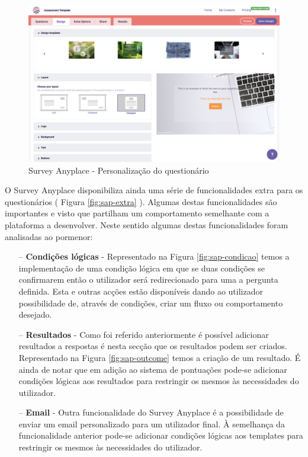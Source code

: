 \begin{figure}[ht!]
	\begin{center}
		\includegraphics[width=1\textwidth]{img/sap/design}
		\caption{Survey Anyplace - Personalização do questionário}
		\label{fig:sap-design}
	\end{center}
\end{figure}

O Survey Anyplace disponibiliza ainda uma série de funcionalidades extra para os questionários ( Figura \ref{fig:sap-extra} ). Algumas destas funcionalidades são importantes e visto que partilham um comportamento semelhante com a plataforma a desenvolver. Neste sentido algumas destas funcionalidades foram analisadas ao pormenor:
\begin{itemize}
	\item[--] \textbf{Condições lógicas} - Representado na Figura \ref{fig:sap-condicao} temos a implementação de uma condição lógica em que se duas condições se confirmarem então o utilizador será redirecionado para uma a pergunta definida. Esta e outras acções estão disponíveis dando ao utilizador possibilidade de, através de condições, criar um fluxo ou comportamento desejado.
	\item[--] \textbf{Resultados} - Como foi referido anteriormente é possível adicionar resultados a respostas é nesta secção que os resultados podem ser criados. Representado na Figura \ref{fig:sap-outcome} temos a criação de um resultado. É ainda de notar que em adição ao sistema de pontuações pode-se adicionar condições lógicas aos resultados para restringir os mesmos às necessidades do utilizador.
	\item[--] \textbf{Email} - Outra funcionalidade do Survey Anyplace é a possibilidade de enviar um email personalizado para um utilizador final. À semelhança da funcionalidade anterior pode-se adicionar condições lógicas aos templates para restringir os mesmos às necessidades do utilizador.
\end{itemize}

